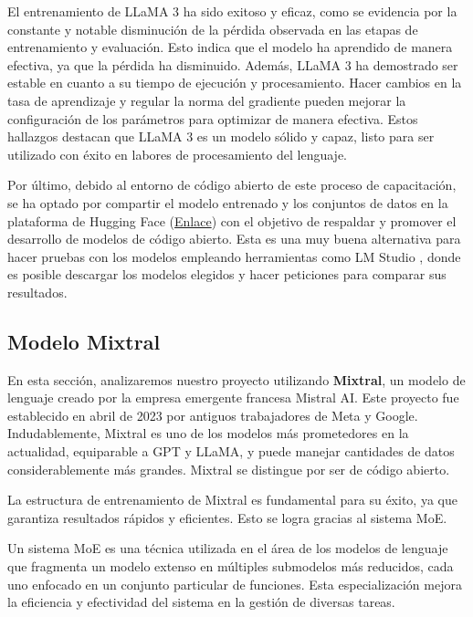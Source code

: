 El entrenamiento de \acrshort{LLaMA} 3 ha sido exitoso y eficaz, como se evidencia por la constante y notable disminución de la pérdida observada en las etapas de entrenamiento y evaluación. Esto indica que el modelo ha aprendido de manera efectiva, ya que la pérdida ha disminuido. Además, \acrshort{LLaMA} 3 ha demostrado ser estable en cuanto a su tiempo de ejecución y procesamiento. Hacer cambios en la tasa de aprendizaje y regular la norma del gradiente pueden mejorar la configuración de los parámetros para optimizar de manera efectiva. Estos hallazgos destacan que \acrshort{LLaMA} 3 es un modelo sólido y capaz, listo para ser utilizado con éxito en labores de procesamiento del lenguaje.
\bigskip %


Por último, debido al entorno de código abierto de este proceso de capacitación, se ha optado por compartir el modelo entrenado y los conjuntos de datos en la plataforma de Hugging Face (\href{https://huggingface.co/eibeel/llama3_python_TFG}{Enlace}) con el objetivo de respaldar y promover el desarrollo de modelos de código abierto. Esta es una muy buena alternativa para hacer pruebas con los modelos empleando herramientas como LM Studio \cite{LMStudio}, donde es posible descargar los modelos elegidos y hacer peticiones para comparar sus resultados.
\bigskip %

\subsection{Modelo Mixtral}

En esta sección, analizaremos nuestro proyecto utilizando \textbf{Mixtral}, un modelo de lenguaje creado por la empresa emergente francesa Mistral AI. Este proyecto fue establecido en abril de 2023 por antiguos trabajadores de Meta y Google. Indudablemente, Mixtral es uno de los modelos más prometedores en la actualidad, equiparable a \acrshort{GPT} y \acrshort{LLaMA}, y puede manejar cantidades de datos considerablemente más grandes. Mixtral se distingue por ser de código abierto.

\bigskip %

La estructura de entrenamiento de Mixtral es fundamental para su éxito, ya que garantiza resultados rápidos y eficientes. Esto se logra gracias al sistema \acrfull{MoE}.

\bigskip %

Un sistema \acrshort{MoE} \cite{MistureExperts} es una técnica utilizada en el área de los modelos de lenguaje que fragmenta un modelo extenso en múltiples submodelos más reducidos, cada uno enfocado en un conjunto particular de funciones. Esta especialización mejora la eficiencia y efectividad del sistema en la gestión de diversas tareas.

